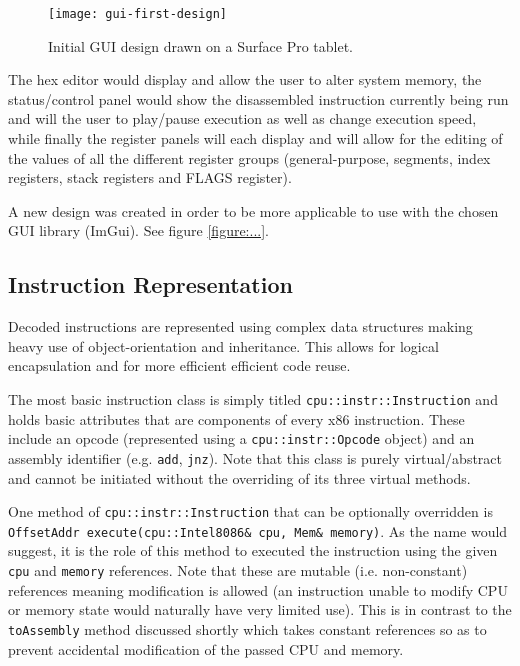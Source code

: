     \begin{figure}
        \centering
        \texttt{[image: gui-first-design]}
        \caption{Initial GUI design drawn on a Surface Pro tablet.}
        \label{figure:gui-first-design}
    \end{figure}

    The hex editor would display and allow the user to alter system memory, the status/control panel would show the disassembled instruction currently being run and will the user to play/pause execution as well as change execution speed, while finally the register panels will each display and will allow for the editing of the values of all the different register groups (general-purpose, segments, index registers, stack registers and FLAGS register).

    A new design was created in order to be more applicable to use with the chosen GUI library (ImGui). See figure \ref{figure:...}.

\subsection{Instruction Representation}
    Decoded instructions are represented using complex data structures making heavy use of object-orientation and inheritance. This allows for logical encapsulation and for more efficient efficient code reuse.

    The most basic instruction class is simply titled \texttt{cpu::instr::Instruction} and holds basic attributes that are components of every x86 instruction. These include an opcode (represented using a \texttt{cpu::instr::Opcode} object) and an assembly identifier (e.g. \texttt{add}, \texttt{jnz}). Note that this class is purely virtual/abstract and cannot be initiated without the overriding of its three virtual methods.

    One method of \texttt{cpu::instr::Instruction} that can be optionally overridden is \texttt{OffsetAddr execute(cpu::Intel8086\& cpu, Mem\& memory)}. As the name would suggest, it is the role of this method to executed the instruction using the given \texttt{cpu} and \texttt{memory} references. Note that these are mutable (i.e. non-constant) references meaning modification is allowed (an instruction unable to modify CPU or memory state would naturally have very limited use). This is in contrast to the \texttt{toAssembly} method discussed shortly which takes constant references so as to prevent accidental modification of the passed CPU and memory.

